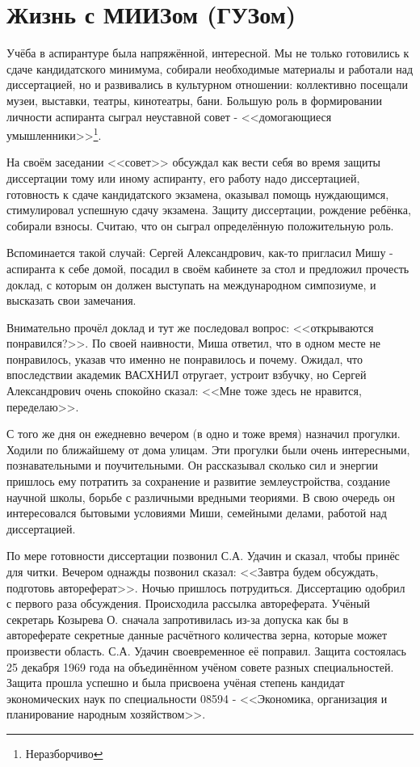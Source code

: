 ﻿\chapter{Жизнь с МИИЗом (ГУЗом)}

Учёба в аспирантуре была напряжённой, интересной. Мы не только готовились к сдаче кандидатского минимума, собирали необходимые материалы и работали над диссертацией, но и развивались в культурном отношении: коллективно посещали музеи, выставки, театры, кинотеатры, бани. Большую роль в формировании личности аспиранта сыграл неуставной совет - <<домогающиеся умышленники>>\footnote{Неразборчиво}. 

На своём заседании <<совет>> обсуждал как вести себя во время защиты диссертации тому или иному аспиранту, его работу надо диссертацией, готовность к сдаче кандидатского экзамена, оказывал помощь нуждающимся, стимулировал успешную сдачу экзамена. Защиту диссертации, рождение ребёнка, собирали взносы. Считаю, что он сыграл определённую положительную роль.

Вспоминается такой случай: Сергей Александрович, как-то пригласил Мишу - аспиранта к себе домой, посадил в своём кабинете за стол и предложил прочесть доклад, с которым он должен выступать на международном симпозиуме, и высказать свои замечания.

Внимательно прочёл доклад и тут же последовал вопрос: <<открываются понравился?>>. По своей наивности, Миша ответил, что в одном месте не понравилось, указав что именно не понравилось и почему. Ожидал, что впоследствии академик ВАСХНИЛ отругает, устроит взбучку, но Сергей Александрович очень спокойно сказал: <<Мне тоже здесь не нравится, переделаю>>.

С того же дня он ежедневно вечером (в одно и тоже время) назначил прогулки. Ходили по ближайшему от дома улицам. Эти прогулки были очень интересными, познавательными и поучительными. Он рассказывал сколько сил и энергии пришлось ему потратить за сохранение и развитие землеустройства, создание научной школы, борьбе с различными вредными теориями. В свою очередь он интересовался бытовыми условиями Миши, семейными делами, работой над диссертацией.

По мере готовности диссертации позвонил С.А. Удачин и сказал, чтобы принёс для читки. Вечером однажды позвонил сказал: <<Завтра будем обсуждать, подготовь автореферат>>. Ночью пришлось потрудиться. Диссертацию одобрил с первого раза обсуждения. Происходила рассылка автореферата. Учёный секретарь Козырева О. сначала запротивилась из-за допуска как бы в автореферате секретные данные расчётного количества зерна, которые может произвести область. С.А. Удачин своевременное её поправил. Защита состоялась 25 декабря 1969 года на объединённом учёном совете разных специальностей. Защита прошла успешно и была присвоена учёная степень кандидат экономических наук по специальности 08594 - <<Экономика, организация и планирование народным хозяйством>>. 


